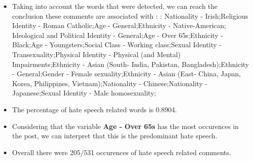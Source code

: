 \documentclass[11pt]{article}
\begin{document}
\begin{itemize}\item Taking into account the words that were detected, we can reach the conclusion these comments are associated with : : Nationality - Irish;Religious Identity - Roman Catholic;Age - General;Ethnicity - Native-American; Ideological and Political Identity - General;Age - Over 65s;Ethnicity - Black;Age - Youngsters;Social Class - Working class;Sexual Identity - Transexuality;Physical Identity - Physical (and Mental) Impairments;Ethnicity - Asian (South- India, Pakistan, Bangladesh);Ethnicity - General;Gender - Female sexuality;Ethnicity - Asian (East- China, Japan, Korea, Philippines, Vietnam);Nationality - Chinese;Nationality - Japanese;Sexual Identity - Male homosexuality;%

\item The percentage of hate speech related words is 0.8904.

\item Considering that the variable \textbf{Age - Over 65s} has the most occurences in the post, we can interpret that this is the predominant hate speech.

\item Overall there were 205/531 occurences of hate speech related comments.\end{itemize}
\end{document}
